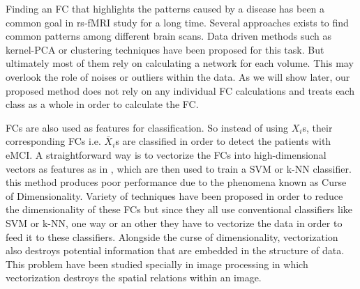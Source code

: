\documentclass[journal]{IEEEtran}
\begin{document}
	
	Finding an FC that highlights the patterns caused by a disease has been a common goal in rs-fMRI study for a long time. Several approaches exists to find common patterns among different brain scans. Data driven methods such as kernel-PCA or clustering techniques have been proposed for this task. But ultimately most of them rely on calculating a network for each volume. This may overlook the role of noises or outliers within the data. As we will show later, our proposed method does not rely on any individual FC calculations and treats each class as a whole in order to calculate the FC.  
	
	FCs are also used as features for classification. So instead of using $X_i$s, their corresponding FCs i.e. $\bar{X}_i$s are classified in order to detect the patients with eMCI. A straightforward way is to vectorize the FCs into high-dimensional vectors as features as in \cite{r33}, which are then used to train a SVM or k-NN classifier. this method produces poor performance due to the phenomena known as Curse of Dimensionality. Variety of techniques have been proposed in order to reduce the dimensionality of these FCs but since they all use conventional classifiers like SVM or k-NN, one way or an other they have to vectorize the data in order to feed it to these classifiers. Alongside  the curse of dimensionality, vectorization also destroys potential information that are embedded in the structure of data. 
	{\color{red}
	This problem have been studied specially in image processing in which vectorization destroys the spatial relations within an image.
	}
\end{document}
